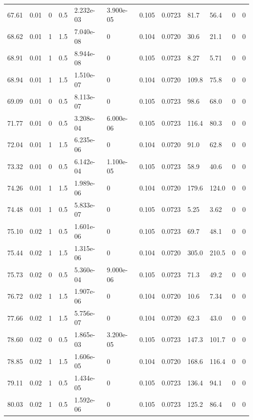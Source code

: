 \documentclass[preview]{standalone}
\begin{document}
{{{{\begin{tabular}{L{1.2cm}C{1.2cm} C{0.3cm}C{0.5cm} C{1.4cm}C{1.4cm} C{1.4cm}C{1.4cm} C{1.6cm}C{1.6cm} C{1.6cm}C{1.6cm}}
  67.61  &  0.01  & 0     & 0.5 &  2.232e-03  & 3.900e-05  &  0.105&   0.0723& 81.7 & 56.4   &  0 & 0  \\ 
  68.62  &  0.01  & 1     & 1.5 &  7.040e-08  & 0  &  0.104&   0.0720& 30.6 & 21.1   &  0 & 0  \\ 
  68.91  &  0.01  & 1     & 0.5 &  8.944e-08  & 0  &  0.105&   0.0723& 8.27 & 5.71   &  0 & 0  \\ 
  68.94  &  0.01  & 1     & 1.5 &  1.510e-07  & 0  &  0.104&   0.0720& 109.8 & 75.8   &  0 & 0  \\ 
  69.09  &  0.01  & 0     & 0.5 &  8.113e-07  & 0  &  0.105&   0.0723& 98.6 & 68.0   &  0 & 0  \\ 
  71.77  &  0.01  & 0     & 0.5 &  3.208e-04  & 6.000e-06  &  0.105&   0.0723& 116.4 & 80.3   &  0 & 0  \\ 
  72.04  &  0.01  & 1     & 1.5 &  6.235e-06  & 0  &  0.104&   0.0720& 91.0 & 62.8   &  0 & 0  \\ 
  73.32  &  0.01  & 0     & 0.5 &  6.142e-04  & 1.100e-05  &  0.105&   0.0723& 58.9 & 40.6   &  0 & 0  \\ 
  74.26  &  0.01  & 1     & 1.5 &  1.989e-06  & 0  &  0.104&   0.0720& 179.6 & 124.0   &  0 & 0  \\ 
  74.48  &  0.01  & 1     & 0.5 &  5.833e-07  & 0  &  0.105&   0.0723& 5.25 & 3.62   &  0 & 0  \\ 
  75.10  &  0.02  & 1     & 0.5 &  1.601e-06  & 0  &  0.105&   0.0723& 69.7 & 48.1   &  0 & 0  \\ 
  75.44  &  0.02  & 1     & 1.5 &  1.315e-06  & 0  &  0.104&   0.0720& 305.0 & 210.5   &  0 & 0  \\ 
  75.73  &  0.02  & 0     & 0.5 &  5.360e-04  & 9.000e-06  &  0.105&   0.0723& 71.3 & 49.2   &  0 & 0  \\ 
  76.72  &  0.02  & 1     & 1.5 &  1.907e-06  & 0  &  0.104&   0.0720& 10.6 & 7.34   &  0 & 0  \\ 
  77.66  &  0.02  & 1     & 1.5 &  5.756e-07  & 0  &  0.104&   0.0720& 62.3 & 43.0   &  0 & 0  \\ 
  78.60  &  0.02  & 0     & 0.5 &  1.865e-03  & 3.200e-05  &  0.105&   0.0723& 147.3 & 101.7   &  0 & 0  \\ 
  78.85  &  0.02  & 1     & 1.5 &  1.606e-05  & 0  &  0.104&   0.0720& 168.6 & 116.4   &  0 & 0  \\ 
  79.11  &  0.02  & 1     & 0.5 &  1.434e-05  & 0  &  0.105&   0.0723& 136.4 & 94.1   &  0 & 0  \\ 
  80.03  &  0.02  & 1     & 0.5 &  1.592e-06  & 0  &  0.105&   0.0723& 125.2 & 86.4   &  0 & 0  \\ 

\end{tabular}}}}}
\end{document}
